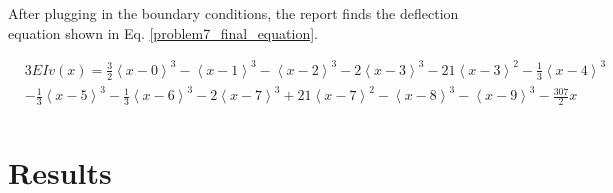 \documentclass[a4paper]{article}
\begin{document}
After plugging in the boundary conditions, the report finds the deflection equation shown in Eq. \ref{problem7_final_equation}.

\begin{equation}
\begin{split}
  & 3EI v(x) = \frac{3}{2}\left<x-0\right>^3 - \left<x-1\right>^3 - \left<x-2\right>^3 - 2\left<x-3\right>^3 - 21\left<x-3\right>^2 - \frac{1}{3}\left<x-4\right>^3 \\
& - \frac{1}{3}\left<x-5\right>^3 - \frac{1}{3}\left<x-6\right>^3 - 2\left<x-7\right>^3 + 21\left<x-7\right>^2 - \left<x-8\right>^3 - \left<x-9\right>^3 -   \frac{307}{2}x\\
\end{split}
\label{problem7_final_equation}
\end{equation}

\section{Results}\label{Results}
\end{document}
